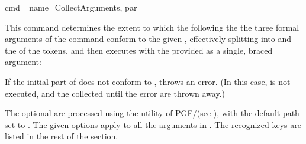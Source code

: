 \documentclass[a4paper,11pt]{article}
\begin{document}
\begin{doc}{cmd={
      name=CollectArguments,
      par=%
      \textcolor{gray}{}}}
  
  This command determines the extent to which the  following the
  the three formal arguments of the command conform to the given , effectively splitting  into  and the  of the tokens, and then executes
   with the  provided as a single, braced
  argument:
  \begin{center}
    \textcolor{gray}{}
  \end{center}
  If the initial part of  does not conform to ,  throws an error.  (In this case,
   is not executed, and the  collected until the
  error are thrown away.)

  The optional  are processed using the  utility of
  PGF/\TikZ (see ), with the default path set to
  .  The given options apply to all the arguments in
  .  The recognized keys are listed in the rest of
  the section.


\end{doc}
\end{document}
